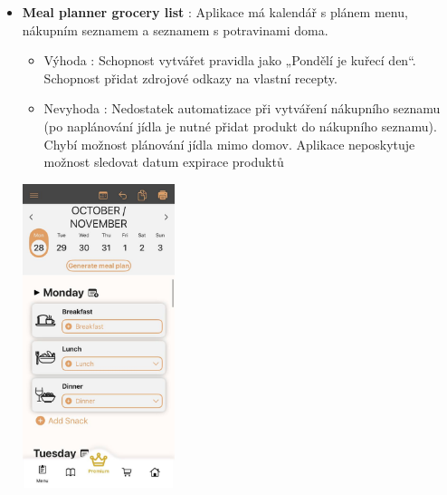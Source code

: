 \documentclass[a4paper,12pt]{article}
\begin{document}
\begin{itemize}
    \item \textbf{Meal planner grocery list} : Aplikace má kalendář s plánem menu, nákupním seznamem a seznamem s potravinami doma.
    \begin{itemize}
        \item Výhoda : Schopnost vytvářet pravidla jako „Pondělí je kuřecí den“. Schopnost přidat zdrojové odkazy na vlastní recepty.
        \item Nevyhoda : Nedostatek automatizace při vytváření nákupního seznamu (po naplánování jídla je nutné přidat produkt do nákupního seznamu). Chybí možnost plánování jídla mimo domov.  Aplikace neposkytuje možnost sledovat datum expirace produktů
    \end{itemize}
    \begin{center}
         \includegraphics[width=0.35\textwidth]{grocerylist.png} %
    \end{center}
    

\end{itemize}
\end{document}
